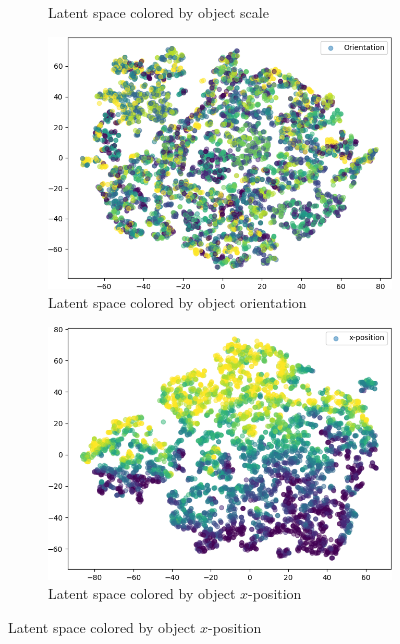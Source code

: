 \begin{figure}
\begin{subfigure}{.19\textwidth}
        \caption{Latent space colored by object scale}
        \label{subfig:vae_embedding_dsprites_scale}
    \end{subfigure}
    \hfill
    \begin{subfigure}{.19\textwidth}
        \includegraphics[width=\textwidth]{images/latent_spaces/dsprites/vae/embeddings_mu_2.png}
        \caption{Latent space colored by object orientation}
        \label{subfig:vae_embedding_dsprites_orientation}
    \end{subfigure}
    \hfill
    \begin{subfigure}{.19\textwidth}
        \includegraphics[width=\textwidth]{images/latent_spaces/dsprites/vae/embeddings_mu_3.png}
        \caption{Latent space colored by object $x$-position}

\end{subfigure}
\end{figure}

